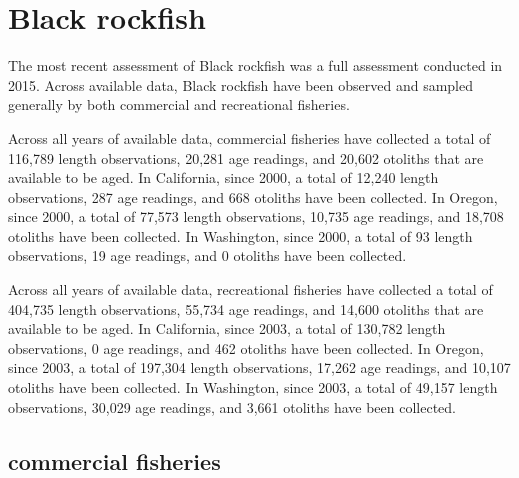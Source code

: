 \documentclass[11pt,
  english,
  letterpaper,
]{article}
\begin{document}

\hypertarget{black-rockfish}{%
\section{Black rockfish}\label{black-rockfish}}

\leavevmode\tagmcend\tagstructend


The most recent assessment of Black rockfish was a full assessment conducted in 2015. Across available data, Black rockfish have been observed and sampled generally by both commercial and recreational fisheries.

\leavevmode\tagmcend\tagstructend\par


Across all years of available data, commercial fisheries have collected a total of 116,789 length observations, 20,281 age readings, and 20,602 otoliths that are available to be aged. In California, since 2000, a total of 12,240 length observations, 287 age readings, and 668 otoliths have been collected. In Oregon, since 2000, a total of 77,573 length observations, 10,735 age readings, and 18,708 otoliths have been collected. In Washington, since 2000, a total of 93 length observations, 19 age readings, and 0 otoliths have been collected.

\leavevmode\tagmcend\tagstructend\par


Across all years of available data, recreational fisheries have collected a total of 404,735 length observations, 55,734 age readings, and 14,600 otoliths that are available to be aged. In California, since 2003, a total of 130,782 length observations, 0 age readings, and 462 otoliths have been collected. In Oregon, since 2003, a total of 197,304 length observations, 17,262 age readings, and 10,107 otoliths have been collected. In Washington, since 2003, a total of 49,157 length observations, 30,029 age readings, and 3,661 otoliths have been collected.

\leavevmode\tagmcend\tagstructend\par


\hypertarget{commercial-fisheries-4}{%
\subsection{commercial fisheries}\label{commercial-fisheries-4}}
\end{document}
